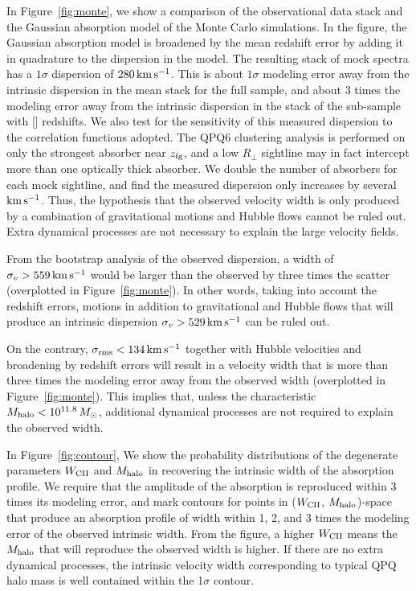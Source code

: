 \documentclass[iop]{emulateapj}
\begin{document}
In Figure~\ref{fig:monte}, we show a comparison of the observational data stack and the Gaussian 
absorption model of the Monte Carlo simulations. In the figure, the Gaussian absorption model is 
broadened by the mean redshift error by adding it in quadrature to the dispersion in the model. 
The resulting stack of mock spectra has a $1\sigma$ dispersion of $280\,{\rm km\,s^{-1}}$. This is
about $1\sigma$ modeling error away from the intrinsic dispersion in the  mean stack for 
the full sample, and about 3 times the modeling error away from the intrinsic dispersion in the 
stack of the sub-sample with [] redshifts. We also test for the 
sensitivity of this measured dispersion to the correlation functions adopted. The QPQ6 clustering 
analysis is performed on only the strongest absorber near $z_{\rm fg}$, and a low $R_\perp$ 
sightline may in fact intercept more than one optically thick absorber. We double the number of 
absorbers for each mock sightline, and find the measured dispersion only increases by several 
${\rm km\,s^{-1}}$. Thus, the hypothesis that the observed velocity width is only produced by a 
combination of gravitational motions and Hubble flows cannot be ruled out. Extra dynamical 
processes are not necessary to explain the large velocity fields. 

From the bootstrap 
analysis of the observed dispersion, a width of $\sigma_v>559\,{\rm km\,s^{-1}}$ would be larger 
than the observed by three times the scatter (overplotted in Figure~\ref{fig:monte}). In other 
words, taking into account the redshift errors, motions in addition to gravitational and Hubble 
flows that will produce an intrinsic dispersion $\sigma_v>529\,{\rm km\,s^{-1}}$ can be ruled out. 

On the contrary, 
$\sigma_{\rm rms}<134\,{\rm km\,s^{-1}}$ together with Hubble velocities and
broadening by redshift errors will result in a velocity width that is more than three times the 
modeling error away from the observed width (overplotted in Figure~\ref{fig:monte}). This implies 
that, unless the characteristic $M_{\rm halo}<10^{11.8}\,M_\odot$,
additional dynamical processes are not required to explain the observed width.  

In Figure~\ref{fig:contour}, We show the probability distributions of the degenerate parameters 
$W_{\rm CII}$ and $M_{\rm halo}$ in recovering the intrinsic width of the absorption profile. We 
require that the amplitude of the absorption is reproduced within 3 times its modeling error, and 
mark contours for points in ($W_{\rm CII}$, $M_{\rm halo}$)-space that produce an absorption 
profile of width within 1, 2, and 3 times the modeling error of the observed intrinsic width. 
From the figure, a higher $W_{\rm CII}$ means the $M_{\rm halo}$ that will reproduce the observed 
width is higher. If there are no extra dynamical processes, the intrinsic velocity width 
corresponding to typical QPQ halo mass is well contained within the 1$\sigma$ contour. 
\end{document}
